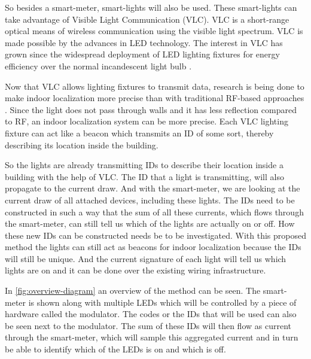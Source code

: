 	So besides a smart-meter, smart-lights will also be used.
	These smart-lights can take advantage of Visible Light Communication (VLC).
	VLC is a short-range optical means of wireless communication using the visible light spectrum.
	VLC is made possible by the advances in LED technology.
	The interest in VLC has grown since the widespread deployment of LED lighting fixtures for energy efficiency over the normal incandescent light bulb \cite{rajagopal2012ieee}.

	Now that VLC allows lighting fixtures to transmit data, research is being done to make indoor localization more precise than with traditional RF-based approaches \cite{Kuo:2014:LIP:2639108.2639109}.
	Since the light does not pass through walls and it has less reflection compared to RF, an indoor localization system can be more precise.
	Each VLC lighting fixture can act like a beacon which transmits an ID of some sort, thereby describing its location inside the building.

	So the lights are already transmitting IDs to describe their location inside a building with the help of VLC.
	The ID that a light is transmitting, will also propagate to the current draw.
	And with the smart-meter, we are looking at the current draw of all attached devices, including these lights.
	The IDs need to be constructed in such a way that the sum of all these currents, which flows through the smart-meter, can still tell us which of the lights are actually on or off.
	How these new IDs can be constructed needs be to be investigated.
	With this proposed method the lights can still act as beacons for indoor localization because the IDs will still be unique.
	And the current signature of each light will tell us which lights are on and it can be done over the existing wiring infrastructure.

	In \autoref{fig:overview-diagram} an overview of the method can be seen.
	The smart-meter is shown along with multiple LEDs which will be controlled by a piece of hardware called the modulator.
	The codes or the IDs that will be used can also be seen next to the modulator.
	The sum of these IDs will then flow as current through the smart-meter, which will sample this aggregated current and in turn be able to identify which of the LEDs is on and which is off.


